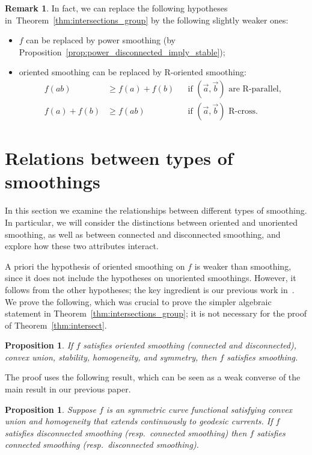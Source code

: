 \documentclass[11pt]{amsart}
\newcommand{\ora}[1]{\overrightarrow{#1}}
\numberwithin{equation}{section}
\numberwithin{figure}{section}
\newtheorem{proposition}[theorem]{Proposition}
\theoremstyle{definition}
\newtheorem{remark}[theorem]{Remark}
\theoremstyle{plain}
\begin{document}
\begin{remark}
In fact,  we can replace the following hypotheses in~Theorem~\ref{thm:intersections_group} by the following slightly weaker ones:
\begin{itemize}
 \item $f$ can be replaced by power smoothing (by Proposition~\ref{prop:power_disconnected_imply_stable});
\item oriented smoothing can be replaced by R-oriented smoothing:
 \begin{align}
f(ab) &\ge f(a) + f(b)
&& \text{if } (\ora{a},\ora{b}) \text{ are R-parallel}, \\
f(a) + f(b) &\ge f(ab)
&& \text{if } (\ora{a},\ora{b}) \text{ R-cross}.
\end{align}
\end{itemize}
\end{remark}




\section{Relations between types of smoothings}
\label{sec:smoothing-types}

In this section we examine the relationships between different types of smoothing. In particular, we will consider the distinctions between oriented and unoriented smoothing, as well as between connected and disconnected smoothing, and explore how these two attributes interact.

A priori the hypothesis of oriented smoothing on $f$ is weaker than
smoothing, since it does not include the hypotheses on unoriented smoothings.
However, it follows from the other hypotheses; the key ingredient is
our previous work in~\cite{MGT21:Smoothings}. We prove the following,
which was crucial to prove the simpler algebraic statement in
Theorem~\ref{thm:intersections_group}; it is not necessary for the
proof of Theorem~\ref{thm:intersect}.

\begin{proposition}
If $f$ satisfies oriented smoothing
(connected and disconnected), convex union,
stability, homogeneity, and symmetry, then $f$ satisfies smoothing.
\label{prop:oriented_smoothing_unoriented}
\end{proposition}

The proof uses the following result, which can be seen as a weak
converse of the main result in our previous paper.
\begin{proposition}
Suppose $f$ is an symmetric curve functional satisfying
convex union and homogeneity that extends continuously to geodesic currents.
If $f$ satisfies disconnected smoothing (resp.\ connected smoothing) then $f$ satisfies connected smoothing (resp.\ disconnected smoothing).
\label{prop:cont_conn_disc}
\end{proposition}
\end{document}
